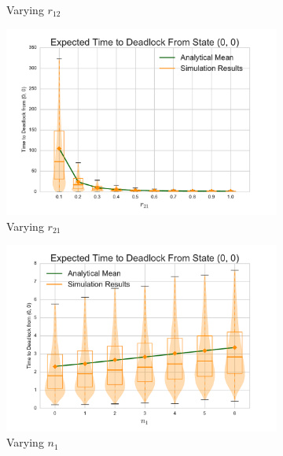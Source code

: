\documentclass{article}
\begin{document}
\begin{figure}[!htbp]
\begin{subfigure}[b]{0.333\textwidth}
    \caption{Varying $r_{12}$}
    \label{fig:2Nms_r12}
  \end{subfigure}
  \begin{subfigure}[b]{0.333\textwidth}
    \includegraphics[width=\textwidth]{images/varyr21_2Nms}
    \caption{Varying $r_{21}$}
    \label{fig:2Nms_r21}
  \end{subfigure}
  \begin{center}
  \begin{subfigure}[b]{0.34\textwidth}
    \includegraphics[width=\textwidth]{images/varyn1_2Nms}
    \caption{Varying $n_1$}
    \label{fig:2Nms_n1}
  \end{subfigure}
  \begin{subfigure}[b]{0.34\textwidth}

\end{subfigure}
\end{center}
\end{figure}
\end{document}
